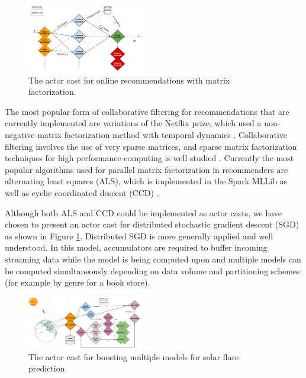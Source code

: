 \documentclass[conference,twocolumn,10pt]{IEEEtran}
\begin{document}
\begin{figure}[!h]
    \centering
    \includegraphics[width=0.45\textwidth]{nnmf_cast}
    \caption{The actor cast for online recommendations with matrix factorization.}
    \label{fig:nnmf_cast}
\end{figure}

The most popular form of collaborative filtering for recommendations that are currently implemented are variations of the Netflix prize, which used a non-negative matrix factorization method with temporal dynamics \cite{koren_collaborative_2010}. Collaborative filtering involves the use of very sparse matrices, and sparse matrix factorization techniques for high performance computing is well studied \cite{gupta_highly_1997}. Currently the most popular algorithms used for parallel matrix factorization in recommenders are alternating least squares (ALS), which is implemented in the Spark MLLib as well as cyclic coordinated descent (CCD) \cite{yu_scalable_2012}.

Although both ALS and CCD could be implemented as actor casts, we have chosen to present an actor cast for distributed stochastic gradient descent (SGD) \cite{gemulla_large-scale_2011} as shown in Figure \ref{fig:nnmf_cast}. Distributed SGD is more generally applied and well understood. In this model, accumulators are required to buffer incoming streaming data while the model is being computed upon and multiple models can be computed simultaneously depending on data volume and partitioning schemes (for example by genre for a book store).

\begin{figure}[!t]
    \centering
    \includegraphics[width=0.45\textwidth]{solar_cast}
    \caption{The actor cast for boosting multiple models for solar flare prediction.}
    \label{fig:solar_cast}
\end{figure}
\end{document}
